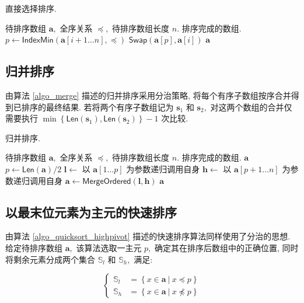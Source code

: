 \documentclass[12pt]{article}
\begin{document}
\begin{algorithm}[H]
\caption{直接选择排序.}
\label{algo_straight_selection}
\begin{algorithmic}[1]
\Require 待排序数组 $\bm{a},$ 全序关系 $\preceq,$ 待排序数组长度 $n.$
\Ensure 排序完成的数组.
    \State $p \gets \mathsf{IndexMin}(\bm{a}[i+1 \dots n], \preceq)$
    \State $\mathsf{Swap}(\bm{a}[p], \bm{a}[i])$
\EndFor
\State \Return $\bm{a}$
\end{algorithmic}
\end{algorithm}

\subsection{归并排序}

由算法 \ref{algo_merge} 描述的归并排序采用分治策略, 将每个有序子数组按序合并得到已排序的最终结果. 若将两个有序子数组记为 $\bm{s}_1$ 和 $\bm{s}_2,$ 对这两个数组的合并仅需要执行 $\min \left\{\textsf{Len}(\bm{s}_1), \textsf{Len}(\bm{s}_2)\right\} - 1$ 次比较.

\begin{algorithm}[H]
\caption{归并排序.}
\label{algo_merge}
\begin{algorithmic}[1]
\Require 待排序数组 $\bm{a},$ 全序关系 $\preceq,$ 待排序数组长度 $n.$
\Ensure 排序完成的数组.
    \State \Return $\bm{a}$
\EndIf
\State $p \gets \mathsf{Len}(\bm{a}) / 2$
\State $\bm{l} \gets$ 以 $\bm{a}[1 \dots p]$ 为参数递归调用自身
\State $\bm{h} \gets$ 以 $\bm{a}[p+1 \dots n]$ 为参数递归调用自身
\State $\bm{a} \gets \mathsf{MergeOrdered}(\bm{l}, \bm{h})$
\State \Return $\bm{a}$
\end{algorithmic}
\end{algorithm}

\subsection{以最末位元素为主元的快速排序}

由算法 \ref{algo_quicksort_highpivot} 描述的快速排序算法同样使用了分治的思想. 给定待排序数组 $\bm{a},$ 该算法选取一主元 $p,$ 确定其在排序后数组中的正确位置, 同时将剩余元素分成两个集合 $\mathbb{S}_l$ 和 $\mathbb{S}_h,$ 满足:

\begin{equation}[H]
  \left\{
    \begin{aligned}
        \mathbb{S}_l & = \left\{x \in \bm{a}\ \vert\ x \preceq p \right\} \\
        \mathbb{S}_h & = \left\{x \in \bm{a}\ \vert\ x \npreceq p \right\}
    \end{aligned}
  \right.
\end{equation}
\end{document}
